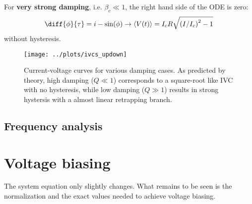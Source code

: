 \documentclass[reprint,onecolumn,%
amsmath,amssymb,aip,apl]{revtex4-1}
\begin{document}
	For \textbf{very strong damping}, i.e. $\beta_c\ll1$, the right hand side of the ODE is zero:
	\begin{eqnarray}
	\diff{\phi}{\tau}=i-\sin(\phi) \rightarrow \langle V(t) \rangle=I_c R\sqrt{\left(I/I_c\right)^2-1}
	\end{eqnarray}
	without hysteresis.
	
	
	\begin{figure}
		\centering
		\texttt{[image: ../plots/ivcs\_updown]}
		\caption{Current-voltage curves for various damping cases.
			As predicted by theory, high damping ($Q\ll1$) corresponds to a square-root like IVC with no hysteresis, while low damping ($Q\gg1$) results in strong hystersis with a almost linear retrapping branch.}
		\label{fig:ivcsupdown}
	\end{figure}
	
	\subsection{Frequency analysis}
	
	\section{Voltage biasing}
	The system equation only slightly changes.
	What remains to be seen is the normalization and the exact values needed to achieve voltage biasing.
	
	
	
\end{document}
